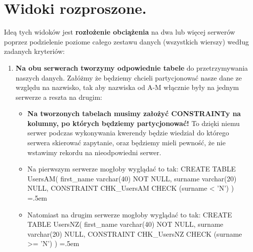 \documentclass[a4paper]{article}
\newenvironment{lcverbatim}
{\SaveVerbatim{cverb}}
{\endSaveVerbatim
\flushleft\fboxrule=0pt\fboxsep=.5em
\colorbox{cverbbg}{%
\makebox[\dimexpr\linewidth-2\fboxsep][l]{\BUseVerbatim{cverb}}%
}
\endflushleft
}
\begin{document}
    \section{Widoki rozproszone.}

    Ideą tych widoków jest \textbf{rozłożenie obciążenia} na dwa lub więcej serwerów poprzez podzielenie poziome
    całego zestawu danych (wszystkich wierszy) według zadanych kryteriów:
    \begin{enumerate}
        \item \textbf{Na obu serwerach tworzymy odpowiednie tabele} do przetrzymywania naszych danych. Załóżmy że
        będziemy chcieli partycjonować nasze dane ze względu na nazwisko, tak aby nazwiska od A-M włącznie
        były na jednym serwerze a reszta na drugim:
        \begin{itemize}
            \item \textbf{Na tworzonych tabelach musimy założyć CONSTRAINTy na kolumny, po których będziemy
            partycjonować!} To dzięki niemu serwer podczas wykonywania kwerendy będzie wiedział do którego serwera
            skierować zapytanie, oraz będziemy mieli pewność, że nie wstawimy rekordu na nieodpowiedni serwer.
            \item Na pierwszym serwerze mogłoby wyglądać to tak:
            \begin{lcverbatim}
                CREATE TABLE UsersAM(
                first_name varchar(40) NOT NULL,
                surname varchar(20) NULL,
                CONSTRAINT CHK_UsersAM CHECK (surname < 'N')
                )
            \end{lcverbatim}
        \end{itemize}
        \begin{itemize}
            \item Natomiast na drugim serwerze mogłoby wyglądać to tak:
            \begin{lcverbatim}
                CREATE TABLE UsersNZ(
                first_name varchar(40) NOT NULL,
                surname varchar(20) NULL,
                CONSTRAINT CHK_UsersNZ CHECK (surname >= 'N')
                )
            \end{lcverbatim}
        \end{itemize}


\end{enumerate}
\end{document}
